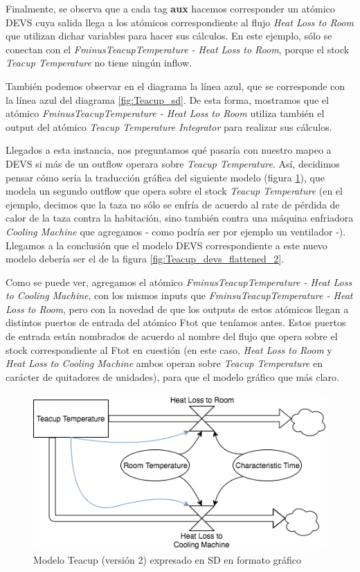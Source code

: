 Finalmente, se observa que a cada tag \textbf{aux} hacemos corresponder un atómico DEVS cuya salida llega a los atómicos correspondiente al flujo \textit{Heat Loss to Room} que utilizan dichar variables para hacer sus cálculos. En este ejemplo, sólo se conectan con el \textit{FminusTeacupTemperature - Heat Loss to Room}, porque el stock \textit{Teacup Temperature} no tiene ningún inflow. 

También podemos observar en el diagrama la línea azul, que se corresponde con la línea azul del diagrama \ref{fig:Teacup_sd}. De esta forma, mostramos que el atómico \textit{FminusTeacupTemperature - Heat Loss to Room} utiliza también el output del atómico \textit{Teacup Temperature Integrator} para realizar sus cálculos. 

Llegados a esta instancia, nos preguntamos qué pasaría con nuestro mapeo a DEVS si más de un outflow operara sobre \textit{Teacup Temperature}. Así, decidimos pensar cómo sería la traducción gráfica del siguiente modelo (figura \ref{fig:Teacup_sd_2}), que modela un segundo outflow que opera sobre el stock \textit{Teacup Temperature} (en el ejemplo, decimos que la taza no sólo se enfría de acuerdo al rate de pérdida de calor de la taza contra la habitación, sino también contra una máquina enfriadora \textit{Cooling Machine} que agregamos - como podría ser por ejemplo un ventilador -). Llegamos a la conclusión que el modelo DEVS correspondiente a este nuevo modelo debería ser el de la figura \ref{fig:Teacup_devs_flattened_2}. 

Como se puede ver, agregamos el atómico \textit{FminusTeacupTemperature - Heat Loss to Cooling Machine}, con los mismos inputs que \textit{FminsuTeacupTemperature - Heat Loss to Room}, pero con la novedad de que los outputs de estos atómicos llegan a distintos puertos de entrada del atómico Ftot que teníamos antes. Estos puertos de entrada están nombrados de acuerdo al nombre del flujo que opera sobre el stock correspondiente al Ftot en cuestión (en este caso, \textit{Heat Loss to Room} y \textit{Heat Loss to Cooling Machine} ambos operan sobre \textit{Teacup Temperature} en carácter de quitadores de unidades), para que el modelo gráfico que más claro.

\begin{figure}[!h]
\centering
\includegraphics[scale=0.4]{imagenes/Teacup_sd_2}
\caption{Modelo Teacup (versión 2) expresado en SD en formato gráfico}
\label{fig:Teacup_sd_2}
\end{figure}

